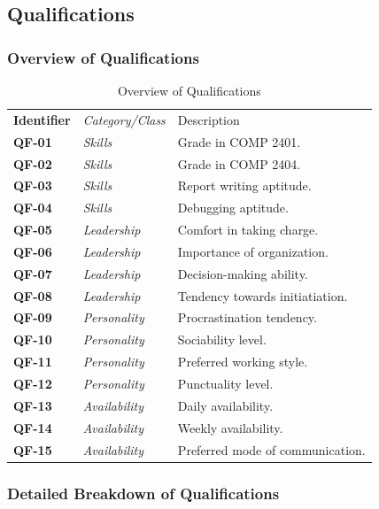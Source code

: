 \documentclass[12pt,letterpaper]{article}
\begin{document}
\subsection{Qualifications}

\subsubsection{Overview of Qualifications}

\begin{table}[H]
	\caption{Overview of Qualifications}
	\begin{tabu} to 
	    \tableheader{}Identifier & Category/Class & Description\\
		QF-01 & Skills & Grade in COMP 2401.\\
		QF-02 & Skills & Grade in COMP 2404.\\
		QF-03 & Skills & Report writing aptitude.\\
		QF-04 & Skills & Debugging aptitude.\\
		QF-05 & Leadership & Comfort in taking charge. \\
		QF-06 & Leadership & Importance of organization. \\
		QF-07 & Leadership & Decision-making ability. \\
		QF-08 & Leadership & Tendency towards initiatiation. \\
		QF-09 & Personality & Procrastination tendency. \\
		QF-10 & Personality & Sociability level. \\
		QF-11 & Personality & Preferred working style. \\
		QF-12 & Personality & Punctuality level. \\
		QF-13 & Availability & Daily availability. \\
		QF-14 & Availability & Weekly availability. \\
		QF-15 & Availability & Preferred mode of communication. \\
	\end{tabu}
\end{table}

\subsubsection{Detailed Breakdown of Qualifications}
\end{document}
